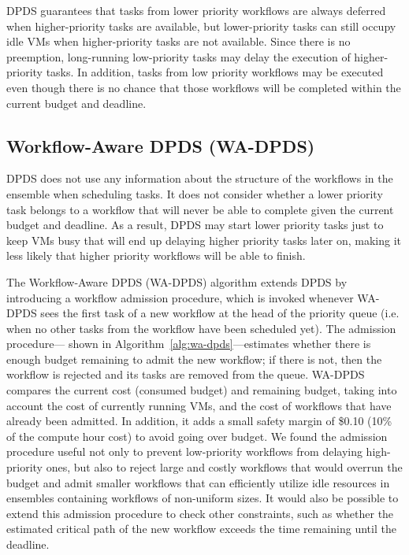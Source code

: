 \documentclass[preprint,5p]{elsarticle}
\begin{document}
DPDS guarantees that tasks from lower priority workflows are always deferred
when higher-priority tasks are available, but lower-priority tasks can still
occupy idle VMs when higher-priority tasks are not available. Since there is
no preemption, long-running low-priority tasks may delay the execution of
higher-priority tasks. In addition, tasks from low priority workflows may be
executed even though there is no chance that those workflows will be completed
within the current budget and deadline. 


\subsection{Workflow-Aware DPDS (WA-DPDS)}

DPDS does not use any information about the structure of the
workflows in the ensemble when scheduling tasks.  It does not
consider whether a lower priority task belongs to a workflow that will never be
able to complete given the current budget and deadline. As a result, DPDS may
start lower priority tasks just to keep VMs busy that will end up delaying
higher priority tasks later on, making it less likely that higher priority
workflows will be able to finish.

The Workflow-Aware DPDS (WA-DPDS) algorithm extends DPDS by introducing a
workflow admission procedure, which is invoked whenever WA-DPDS sees the first
task of a new workflow at the head of the priority queue (i.e. when no other
tasks from the workflow have been scheduled yet). The admission procedure---
shown in Algorithm~\ref{alg:wa-dpds}---estimates whether there is enough
budget remaining to admit the new workflow; if there is not, then the workflow
is rejected and its tasks are removed from the queue. WA-DPDS compares the
current cost (consumed budget) and remaining budget, taking into account the
cost of currently running VMs, and the cost of workflows that have already
been admitted. In addition, it adds a small safety margin of \$0.10 (10\% of the
compute hour cost) to avoid going over budget. We found the admission procedure useful not only to prevent
low-priority workflows from delaying high-priority ones, but also to reject
large and costly workflows that would overrun the budget and admit smaller
workflows that can efficiently utilize idle resources in 
ensembles containing workflows of non-uniform sizes. It would also be possible 
to extend this admission procedure to check other constraints, such as whether
the estimated critical path of the new workflow exceeds the time remaining
until the deadline.
\end{document}
